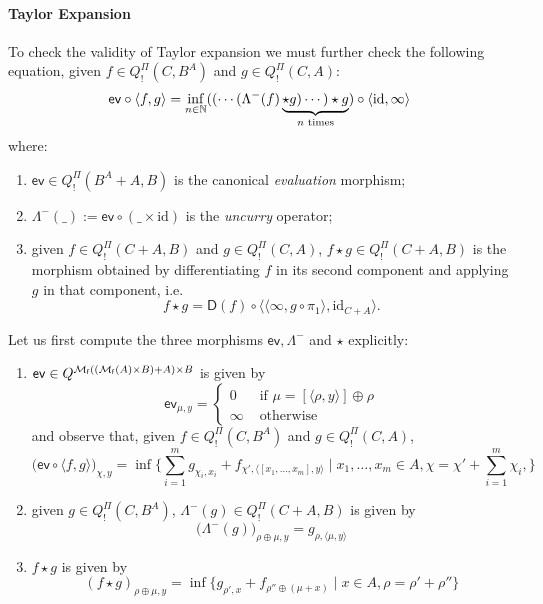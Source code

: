 \paragraph{Taylor Expansion }


To check the validity of Taylor expansion we must further check the following equation, given $f\in Q^{\Pi}_{!}(C, B^{A})$ and $g\in Q^{\Pi}_{!}(C,A)$:
$$
\mathsf{ev}\circ \langle f,g\rangle= \inf_{n\in \mathbb{N}}
(( \cdots (\Lambda^{-}(f) \underbrace{\star g)\cdots )\star g}_{n\text{ times}})\circ \langle \mathrm{id}, \infty\rangle
$$
where:
\begin{enumerate}
\item $\mathsf{ev}\in Q^{\Pi}_{!}(B^{A}+A, B)$ is the canonical \emph{evaluation} morphism;

\item $\Lambda^{-}(\_):= \mathsf{ev}\circ (\_\times \mathrm{id})$ is the \emph{uncurry} operator;

\item given $f\in Q^{\Pi}_{!}(C+A,B)$ and $g\in Q^{\Pi}_{!}(C,A)$, 
$f\star g\in Q^{\Pi}_{!}(C+A,B)$ is the morphism obtained by differentiating $f$ in its second component and applying $g$ in that component, i.e.~
$$
f\star g =  \mathsf{D}(f)\circ \langle \langle \infty, g\circ \pi_{1}\rangle, \mathrm{id}_{C+A}\rangle.
$$ 

\end{enumerate}



Let us first compute the three morphisms $\mathsf{ev}, \Lambda^{-}$ and $\star$ explicitly:
\begin{enumerate}

\item $\mathsf{ev}\in Q^{ \mathcal{M}_{\mathsf f}(  ( \mathcal{M}_{\mathsf f}(A)\times B)       +  A    ) \times B  }$ is given by
$$\mathsf{ev}_{\mu,y}=
 \begin{cases}
 0 & \text{ if } \mu=[ \langle\rho, y\rangle]  \oplus \rho \\
 \infty & \text{ otherwise}
 \end{cases}
 $$
and observe that, given $f\in Q^{\Pi}_{!}(C, B^{A})$ and $g\in Q^{\Pi}_{!}(C,A)$, 
$$
\big(\mathsf{ev}\circ \langle f,g\rangle \big)_{\chi, y}= 
\inf\Big \{ 
\sum_{i=1}^{m}g_{\chi_{i},x_{i}}+
f_{\chi', \langle [x_{1},\dots, x_{m}],y\rangle}
\mid 
x_{1},\dots, x_{m}\in A,
\chi= \chi'+\sum_{i=1}^{m}\chi_{i}, 
\Big \}
$$



\item given $g\in Q^{\Pi}_{!}(C, B^{A})$, 
$\Lambda^{-}(g)\in Q^{\Pi}_{!}(C+A, B)$ is given by 
$$
\big(\Lambda^{-}(g)\big)_{\rho\oplus\mu,y}=g_{\rho, \langle \mu,y\rangle}
$$


\item $f\star g$ is given by 
$$
(f\star g)_{\rho\oplus\mu,y}=
\inf\Big\{
g_{\rho',x}+
f_{\rho''\oplus(\mu+x)}
\mid
x\in A,
\rho= \rho'+\rho''
\Big\}
$$

\end{enumerate}


